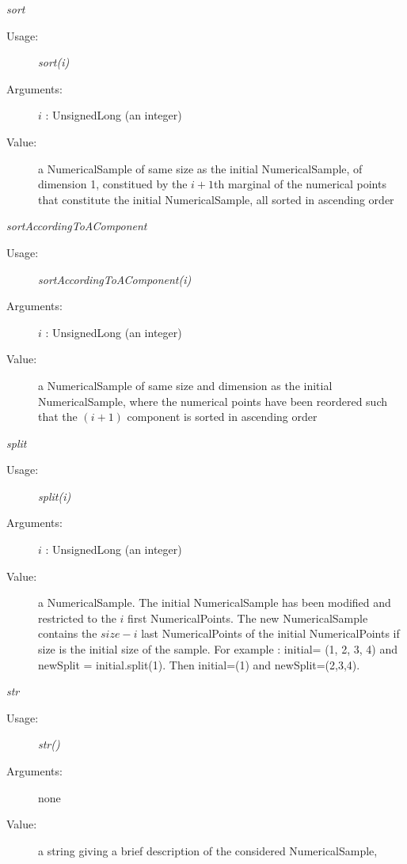 \begin{description}
\begin{description}
\item \textit{sort}
\begin{description}
\item[Usage:] \textit{sort(i)}
\item[Arguments:] $i$ : UnsignedLong (an integer)
\item[Value:] a NumericalSample of same size as the initial NumericalSample, of dimension 1, constitued by the $i+1$th marginal of the numerical points that constitute the initial NumericalSample,  all sorted in ascending order
\end{description}
\bigskip

\item \textit{sortAccordingToAComponent}
\begin{description}
\item[Usage:] \textit{sortAccordingToAComponent(i)}
\item[Arguments:] $i$ : UnsignedLong (an integer)
\item[Value:] a NumericalSample of same size and dimension as the initial NumericalSample, where the numerical points have been reordered such that the $(i+1)$ component is sorted in ascending order
\end{description}
\bigskip


\item \textit{split}
\begin{description}
\item[Usage:] \textit{split(i)}
\item[Arguments:] $i$ : UnsignedLong (an integer)
\item[Value:] a NumericalSample. The initial NumericalSample has been modified and restricted to the $i$ first NumericalPoints. The new NumericalSample contains the $size - i$ last NumericalPoints of the initial NumericalPoints if size is the initial size of the sample.
For example : initial= (1, 2, 3, 4) and newSplit = initial.split(1). Then initial=(1) and newSplit=(2,3,4).
\end{description}
\bigskip


\item \textit{str}
\begin{description}
\item[Usage:] \textit{str()}
\item[Arguments:] none
\item[Value:] a string giving a brief description of the considered NumericalSample,
\end{description}
\bigskip



\end{description}
\end{description}
